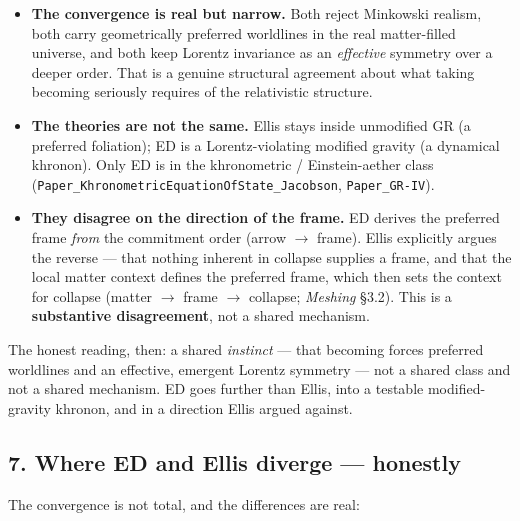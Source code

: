 \documentclass[
  11pt,
]{article}
\providecommand{\tightlist}{%
  \setlength{\itemsep}{0pt}\setlength{\parskip}{0pt}}
\providecommand{\tightlist}{}
\begin{document}
\begin{itemize}
\tightlist
\item
  \textbf{The convergence is real but narrow.} Both reject Minkowski
  realism, both carry geometrically preferred worldlines in the real
  matter-filled universe, and both keep Lorentz invariance as an
  \emph{effective} symmetry over a deeper order. That is a genuine
  structural agreement about what taking becoming seriously requires of
  the relativistic structure.
\item
  \textbf{The theories are not the same.} Ellis stays inside unmodified
  GR (a preferred foliation); ED is a Lorentz-violating modified gravity
  (a dynamical khronon). Only ED is in the khronometric /
  Einstein-aether class
  (\texttt{Paper\_KhronometricEquationOfState\_Jacobson},
  \texttt{Paper\_GR-IV}).
\item
  \textbf{They disagree on the direction of the frame.} ED derives the
  preferred frame \emph{from} the commitment order (arrow \(\to\)
  frame). Ellis explicitly argues the reverse --- that nothing inherent
  in collapse supplies a frame, and that the local matter context
  defines the preferred frame, which then sets the context for collapse
  (matter \(\to\) frame \(\to\) collapse; \emph{Meshing} §3.2). This is
  a \textbf{substantive disagreement}, not a shared mechanism.
\end{itemize}

The honest reading, then: a shared \emph{instinct} --- that becoming
forces preferred worldlines and an effective, emergent Lorentz symmetry
--- not a shared class and not a shared mechanism. ED goes further than
Ellis, into a testable modified-gravity khronon, and in a direction
Ellis argued against.

\subsection{7. Where ED and Ellis diverge ---
honestly}\label{where-ed-and-ellis-diverge-honestly}

The convergence is not total, and the differences are real:
\end{document}

